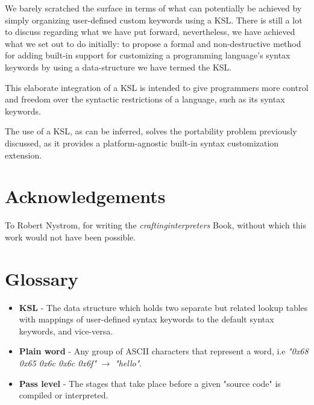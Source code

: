 \documentclass[a4paper,9pt]{article}
\begin{document}
We barely scratched the surface in terms of what can potentially be achieved by simply organizing user-defined custom keywords using a KSL. There is still a lot to discuss regarding what we have put forward, nevertheless, we have achieved what we set out to do initially: to propose a formal and non-destructive method for adding built-in support for customizing a programming language's syntax keywords by using a data-structure we have termed the KSL.
  
This elaborate integration of a KSL is intended to give programmers more control and freedom over the syntactic restrictions of a language, such as its syntax keywords.
  
The use of a KSL, as can be inferred, solves the portability problem previously discussed, as it provides a platform-agnostic built-in syntax customization extension.

\section{Acknowledgements}
To Robert Nystrom, for writing the \textit{craftinginterpreters} \cite{CI} Book, without which this work would not have been possible.

\section{Glossary}

\begin{itemize}
	\item \textbf{KSL} - The data structure which holds two separate but related lookup tables with mappings of user-defined syntax keywords to the default syntax keywords, and vice-versa.
	\item \textbf{Plain word} - Any group of ASCII characters that represent a word, i.e \textit{"0x68 0x65 0x6c 0x6c 0x6f"} $\rightarrow$ \textit{"hello"}.
	\item \textbf{Pass level} - The stages that take place before a given "source code" is compiled or interpreted.
\end{itemize}



\end{document}
